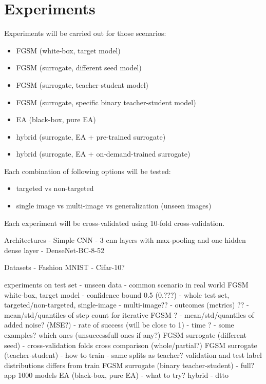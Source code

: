 \chapter{Experiments}
Experiments will be carried out for those scenarios:
\begin{itemize}
\item FGSM (white-box, target model)
\item FGSM (surrogate, different seed model)
\item FGSM (surrogate, teacher-student model)
\item FGSM (surrogate, specific binary teacher-student model)
\item EA (black-box, pure EA)
\item hybrid (surrogate, EA + pre-trained surrogate)
\item hybrid (surrogate, EA + on-demand-trained surrogate)
\end{itemize}

Each combination of following options will be tested:
\begin{itemize}
\item targeted vs non-targeted
\item single image vs multi-image vs generalization (unseen images)
\end{itemize}

Each experiment will be cross-validated using 10-fold cross-validation.

Architectures
- Simple CNN - 3 cnn layers with max-pooling and one hidden dense layer
- DenseNet-BC-8-52

Datasets
- Fashion MNIST
- Cifar-10?

experiments on test set - unseen data - common scenario in real world
FGSM white-box, target model - confidence bound 0.5 (0.???)
- whole test set, targeted/non-targeted, single-image
- multi-image??
- outcomes (metrics) ??
    - mean/std/quantiles of step count for iterative FGSM ?
    - mean/std/quantiles of added noise? (MSE?)
    - rate of success (will be close to 1)
    - time ?
    - some examples? which ones (unsuccessfull ones if any?)
FGSM surrogate (different seed)
- cross-validation folds cross comparison (whole/partial?)
FGSM surrogate (teacher-student)
- how to train - same splits as teacher? validation and test label distributions differs from train
FGSM surrogate (binary teacher-student)
- full? app 1000 models
EA (black-box, pure EA)
- what to try?
hybrid
- dtto